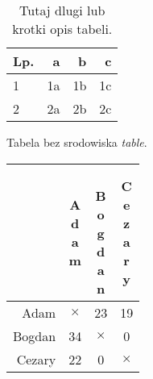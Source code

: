 \documentclass[12pt]{article}
\begin{document}

\begin{table}
\caption[Opcjonalny krotki opis tabeli.]{
\label{tab1}
Tutaj dlugi lub krotki opis tabeli.}
\begin{center}
\begin{tabular}{lrrr}
\hline\hline
Lp. & a & b & c \\
\hline
1 & 1a & 1b & 1c \\
2 & 2a & 2b & 2c \\ %
\hline\hline
\end{tabular}
\end{center}
\end{table}

Tabela bez srodowiska {\em table}.

\begin{center}
\newcommand{\temp}[1]{\multicolumn{1}{|r|}{#1}}
\begin{tabular}{r|c|c|c|}
\cline{2-4}
& \shortstack{A\\d\\a\\m}
& \shortstack{\rule{0mm}{1mm}\\B\\o\\g\\d\\a\\n}
& \shortstack{C\\e\\z\\a\\r\\y} \\ 
\hline
\temp{Adam} & $\times$ & 23 & 19 \\
\hline
\temp{Bogdan} & 34 & $\times$ & 0 \\
\hline
\temp{Cezary} & 22 & 0 & $\times$ \\
\hline
\end{tabular}
\end{center}
\end{document}
